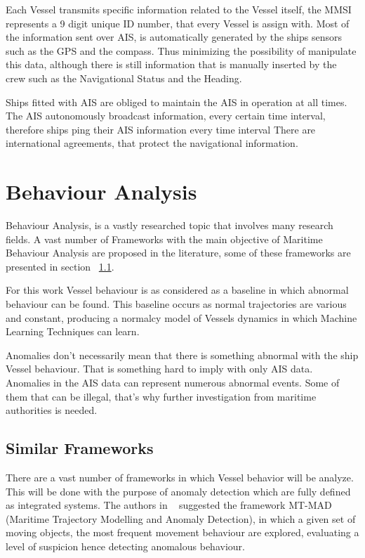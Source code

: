 Each Vessel transmits specific information related to the Vessel itself, the MMSI represents a 9 digit unique ID number, that every Vessel is assign with.
Most of the information sent over AIS, is automatically generated by the ships sensors such as the GPS and the compass. Thus minimizing the possibility of manipulate this data, although there is still information that is manually inserted by the crew such as the Navigational Status and the Heading.

Ships fitted with AIS are obliged to maintain the AIS in operation at all times. The AIS autonomously broadcast information, every certain time interval, therefore ships ping their AIS information every time interval   There are international agreements, that protect the navigational information.


\section{Behaviour Analysis}
Behaviour Analysis, is a vastly researched topic that involves many research fields. A vast number of Frameworks with the main objective of Maritime Behaviour Analysis are proposed in the literature, some of these frameworks are presented in section ~\ref{section: Similar Frameworks}.

For this work Vessel behaviour is as considered as a baseline in which abnormal behaviour can be found. This baseline occurs as normal trajectories are various and constant, producing a normalcy model of Vessels dynamics in which Machine Learning Techniques can learn.

Anomalies don't necessarily mean that there is something abnormal with the ship Vessel behaviour. That is something hard to imply with only AIS data. Anomalies in the AIS data can represent numerous abnormal events. Some of them that can be illegal, that's why further investigation from maritime authorities is needed. 

\subsection{Similar Frameworks}
\label{section: Similar Frameworks}

There are a vast number of frameworks in which Vessel behavior will be analyze. This will be done with the purpose of anomaly detection which are fully defined as integrated systems. The authors in ~\cite{Lei2016} suggested the framework MT-MAD (Maritime Trajectory Modelling and Anomaly Detection), in which a given set of moving objects, the most frequent movement behaviour are explored, evaluating a level of suspicion hence detecting anomalous behaviour.

